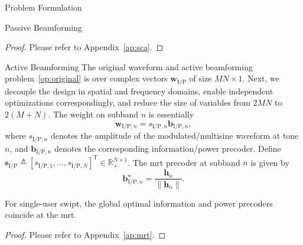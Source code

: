 \begin{section}{Problem Formulation}
\begin{subsection}{Passive Beamforming}
		\begin{proof}\label{pf:sca}
			Please refer to Appendix~\ref{ap:sca}.
		\end{proof}
	\end{subsection}

	\begin{subsection}{Active Beamforming}
		The original waveform and active beamforming problem~\eqref{op:original} is over complex vectors $\mathbf{w}_{\mathrm{I/P}}$ of size $MN \times 1$. Next, we decouple the design in spatial and frequency domains, enable independent optimizations correspondingly, and reduce the size of variables from $2MN$ to $2(M+N)$. The weight on subband $n$ is essentially
		\begin{equation}\label{eq:w}
			\mathbf{w}_{\mathrm{I/P}, n} = s_{\mathrm{I/P}, n} \mathbf{b}_{\mathrm{I/P}, n},
		\end{equation}
		where $s_{\mathrm{I/P},n}$ denotes the amplitude of the modulated/multisine waveform at tone $n$, and $\mathbf{b}_{\mathrm{I/P}, n}$ denotes the corresponding information/power precoder. Define $\mathbf{s}_{\mathrm{I/P}} \triangleq [s_{\mathrm{I/P},1},\dots,s_{\mathrm{I/P},N}]^\mathsf{T} \in \mathbb{R}_+^{N \times 1}$. The \gls{mrt} precoder at subband $n$ is given by
		\begin{equation}\label{eq:b_n}
			\mathbf{b}_{\mathrm{I/P}, n}^\star = \frac{\mathbf{h}_n}{\lVert{\mathbf{h}_n}\rVert}.
		\end{equation}

		\begin{proposition}\label{pr:mrt}
			For single-user \gls{swipt}, the global optimal information and power precoders coincide at the \gls{mrt}.
		\end{proposition}

		\begin{proof}\label{pf:mrt}
			Please refer to Appendix~\ref{ap:mrt}.
		\end{proof}
	\end{subsection}



\end{section}
